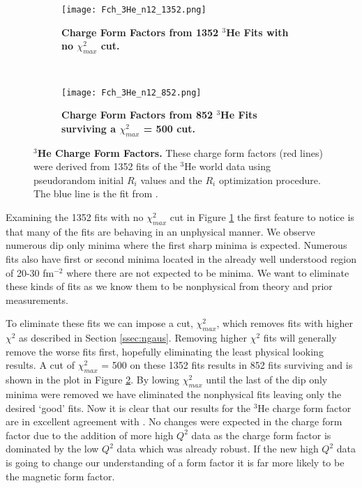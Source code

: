 \begin{figure}[!ht]
\begin{subfigure}{1.\textwidth}
  \centering
  \texttt{[image: Fch\_3He\_n12\_1352.png]}
  \caption{\bf{Charge Form Factors from 1352 $^3$He Fits with no $\chi^2_{max}$ cut.}}
  \label{fig:3he_fch_no_cut}
\end{subfigure}\\
\begin{subfigure}{1.\textwidth}
  \centering
  \texttt{[image: Fch\_3He\_n12\_852.png]}
  \caption{\bf{Charge Form Factors from 852 $^3$He Fits surviving a $\chi^2_{max}$ = 500 cut.}}
  \label{fig:3he_fch_cut}
\end{subfigure}
\caption[$^3$He Charge Form Factors] {
{\bf{$^3$He Charge Form Factors.}} These charge form factors (red lines) were derived from 1352 fits of the $^3$He world data using pseudorandom initial $R_i$ values and the $R_i$ optimization procedure. The blue line is the fit from \cite{Article:Amroun}.}
\label{fig:3he_fch}
\end{figure}

Examining the 1352 fits with no $\chi^2_{max}$ cut in Figure \ref{fig:3he_fch_no_cut} the first feature to notice is that many of the fits are behaving in an unphysical manner. We observe numerous dip only minima where the first sharp minima is expected. Numerous fits also have first or second minima located in the already well understood region of 20-30 fm$^{-2}$ where there are not expected to be minima. We want to eliminate these kinds of fits as we know them to be nonphysical from theory and prior measurements. 

To eliminate these fits we can impose a cut, $\chi^2_{max}$, which removes fits with higher $\chi^2$ as described in Section \ref{ssec:ngaus}. Removing higher $\chi^2$ fits will generally remove the worse fits first, hopefully eliminating the least physical looking results. A cut of $\chi^2_{max}$ = 500 on these 1352 fits results in 852 fits surviving and is shown in the plot in Figure \ref{fig:3he_fch_cut}. By lowing $\chi^2_{max}$ until the last of the dip only minima were removed we have eliminated the nonphysical fits leaving only the desired `good' fits. Now it is clear that our results for the $^3$He charge form factor are in excellent agreement with \cite{Article:Amroun}. No changes were expected in the charge form factor due to the addition of more high $Q^2$ data as the charge form factor is dominated by the low $Q^2$ data which was already robust. If the new high $Q^2$ data is going to change our understanding of a form factor it is far more likely to be the magnetic form factor.

